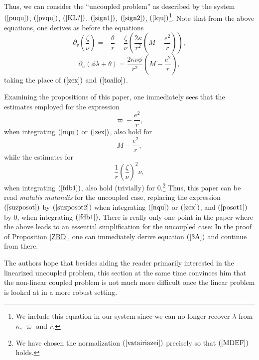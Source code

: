 \documentclass{article}
\newcommand{\zn}{\frac{\zeta}{\nu}}
\begin{document}
Thus, we can consider the ``uncoupled problem'' 
as described by the system $(\ref{puqu})$, $(\ref{pvqu})$,
$(\ref{KL?})$, 
$(\ref{sign1})$, $(\ref{sign2})$,
$(\ref{lqu})$\footnote{We include this equation in our system
since we can no longer recover $\lambda$ from $\kappa$, $\varpi$ and $r$.}.
Note that from the above equations, one
derives as before the equations
\begin{equation}
\label{zex-u}
\partial_v\left(\zn\right)=
-\frac{\theta}r-\zn\left(\frac{2\kappa}{r^2}\left(
M-\frac{e^2}r\right)\right),
\end{equation}
\begin{equation}
\label{avafora-u}
\partial_u(\phi\lambda+\theta)=\frac{2\kappa\nu\phi}{r^2}
				\left(M-\frac{e^2}r\right),
\end{equation}
taking the place of $(\ref{zex})$ and $(\ref{toallo})$.

Examining the propositions of this paper, one
immediately sees that the estimates employed for the expression 
\begin{equation}
\label{suzposot}
\varpi-
\frac{e^2}{r},
\end{equation}
when integrating $(\ref{nqu})$ or $(\ref{zex})$, 
also hold for
\begin{equation}
\label{posot1}
M-\frac{e^2}{r},
\end{equation}
while 
the estimates for
\begin{equation}
\label{suzposot2}
\frac1r\left(\zn\right)^2\nu,
\end{equation}
when integrating $(\ref{fdb1})$,
also hold (trivially) for $0$.\footnote{We have chosen the normalization
$(\ref{vatairiazei})$ precisely so that $(\ref{MDEF})$ holds.}
 Thus, this paper can be read
\emph{mutatis mutandis} for the uncoupled case, replacing 
the expression $(\ref{suzposot})$ by $(\ref{suzposot2})$
when integrating $(\ref{nqu})$ or $(\ref{zex})$, and $(\ref{posot1})$ by $0$,
when integrating $(\ref{fdb1})$. 
There is really only one point in the paper where the above leads to
an essential
simplification for the
uncoupled case: In the proof of 
Proposition \ref{ZBD}, 
one can immediately derive equation $(\ref{3A})$
and continue from there.

The authors hope that besides aiding the 
reader primarily interested in the linearized uncoupled problem,
this section at the same time convinces him that the
non-linear coupled problem is not much more 
difficult once the linear problem
is looked at in a more robust setting.

\appendix
\end{document}

